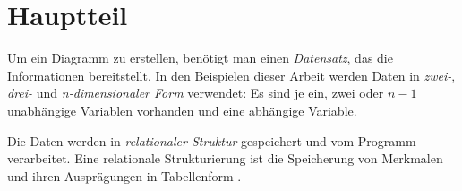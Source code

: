 \chapter{Hauptteil}


Um ein Diagramm zu erstellen, benötigt man einen \textit{Datensatz}, das die Informationen bereitstellt. In den Beispielen dieser Arbeit werden Daten in \textit{zwei-}, \textit{drei-} und \textit{n-dimensionaler Form} verwendet: Es sind je ein, zwei oder $n-1$ unabhängige Variablen vorhanden und eine abhängige Variable. 

Die Daten werden in \textit{relationaler Struktur} gespeichert und vom Programm verarbeitet. Eine relationale Strukturierung ist die Speicherung von Merkmalen und ihren Ausprägungen in Tabellenform \cite{viz}.




